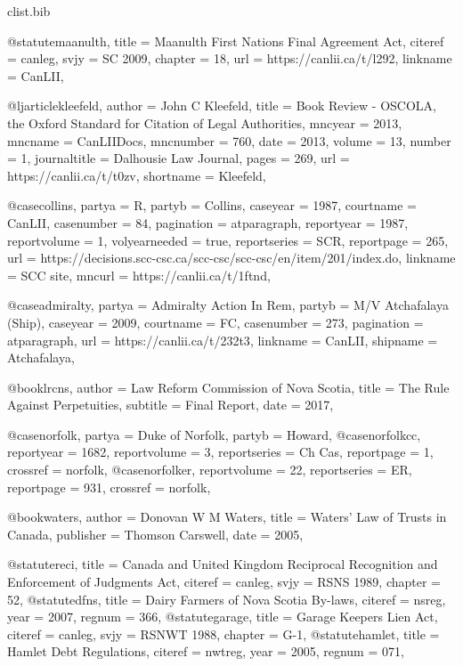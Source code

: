 

\begin{filecontents*}[overwrite]{clist\jobname.bib}


@statute{maanulth,	title =  {Maanulth First Nations Final Agreement Act},	citeref =  {canleg},	svjy =  {SC 2009},	chapter =  {18},			url =  {https://canlii.ca/t/l292},	linkname =  {CanLII},							}

@ljarticle{kleefeld,	author =  {John C Kleefeld},	title =  {Book Review - OSCOLA, the Oxford Standard for Citation of Legal Authorities},		mncyear =  {2013},	mncname =  {CanLIIDocs},	mncnumber =  {760},	date =  {2013},	volume =  {13},	number =  {1},	journaltitle =  {Dalhousie Law Journal},	pages =  {269},	url =  {https://canlii.ca/t/t0zv},	shortname =  {Kleefeld},		}

@case{collins,	partya =  {R},	partyb =  {Collins},		caseyear =  {1987},	courtname =  {CanLII},	casenumber =  {84},	pagination =  {atparagraph},	reportyear =  {1987},	reportvolume =  {1},	volyearneeded =  {true},	reportseries =  {SCR},	reportpage =  {265},	url =  {https://decisions.scc-csc.ca/scc-csc/scc-csc/en/item/201/index.do},	linkname =  {SCC site},	mncurl =  {https://canlii.ca/t/1ftnd},											}

@case{admiralty,	partya =  {Admiralty Action In Rem},	partyb =  {M/V Atchafalaya (Ship)},		caseyear =  {2009},	courtname =  {FC},	casenumber =  {273},	pagination =  {atparagraph},						url =  {https://canlii.ca/t/232t3},	linkname =  {CanLII},										shipname =  {Atchafalaya},		}


@book{lrcns,	author =  {{Law Reform Commission of Nova Scotia}},		title =  {The Rule Against Perpetuities},	subtitle =  {Final Report},			date =  {2017},							}

@case{norfolk,	partya =  {Duke of Norfolk},	partyb =  {Howard},																							}
@case{norfolkcc,								reportyear =  {1682},	reportvolume =  {3},		reportseries =  {Ch Cas},	reportpage =  {1},												crossref =  {norfolk},	}
@case{norfolker,									reportvolume =  {22},		reportseries =  {ER},	reportpage =  {931},												crossref =  {norfolk},	}


@book{waters,	author =  {Donovan W M Waters},		title =  {Waters' Law of Trusts in Canada},			publisher =  {Thomson Carswell},	date =  {2005},							}

@statute{reci,	title =  {Canada and United Kingdom Reciprocal Recognition and Enforcement of Judgments Act},	citeref =  {canleg},	svjy =  {RSNS 1989},	chapter =  {52},											}
@statute{dfns,	title =  {Dairy Farmers of Nova Scotia By-laws},	citeref =  {nsreg},			year =  {2007},	regnum =  {366},									}
@statute{garage,	title =  {Garage Keepers Lien Act},	citeref =  {canleg},	svjy =  {RSNWT 1988},	chapter =  {G-1},											}
@statute{hamlet,	title =  {Hamlet Debt Regulations},	citeref =  {nwtreg},			year =  {2005},	regnum =  {071},									}



\end{filecontents*}
